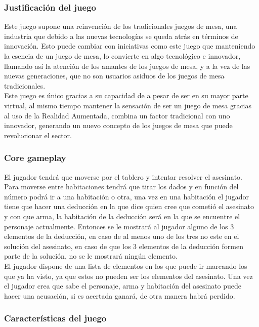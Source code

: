 \subsubsection{Justificación del juego}
Este juego supone una reinvención de los tradicionales juegos de mesa, una industria que debido a las nuevas tecnologías se queda atrás en términos de innovación. Esto puede cambiar con iniciativas como este juego que manteniendo la esencia de un juego de mesa, lo convierte en algo tecnológico e innovador, llamando así la atención de los amantes de los juegos de mesa, y a la vez de las nuevas generaciones, que no son usuarios asiduos de los juegos de mesa tradicionales.\\

Este juego es único gracias a su capacidad de a pesar de ser en su mayor parte virtual, al mismo tiempo mantener la sensación de ser un juego de mesa gracias al uso de la Realidad Aumentada, combina un factor tradicional con uno innovador, generando un nuevo concepto de los juegos de mesa que puede revolucionar el sector.

\subsubsection{Core gameplay}
El jugador tendrá que moverse por el tablero y intentar resolver el asesinato. Para moverse entre habitaciones tendrá que tirar los dados y en función del número podrá ir a una habitación o otra, una vez en una habitación el jugador tiene que hacer una deducción en la que dice quien cree que cometió el asesinato y con que arma, la habitación de la deducción será en la que se encuentre el personaje actualmente. Entonces se le mostrará al jugador alguno de los 3 elementos de la deducción, en caso de al menos uno de los tres no este en el solución del asesinato, en caso de que los 3 elementos de la deducción formen parte de la solución, no se le mostrará ningún elemento.\\

El jugador dispone de una lista de elementos en los que puede ir marcando los que ya ha visto, ya que estos no pueden ser los elementos del asesinato. Una vez el jugador crea que sabe el personaje, arma y habitación del asesinato puede hacer una acusación, si es acertada ganará, de otra manera habrá perdido.

\subsubsection{Características del juego}

